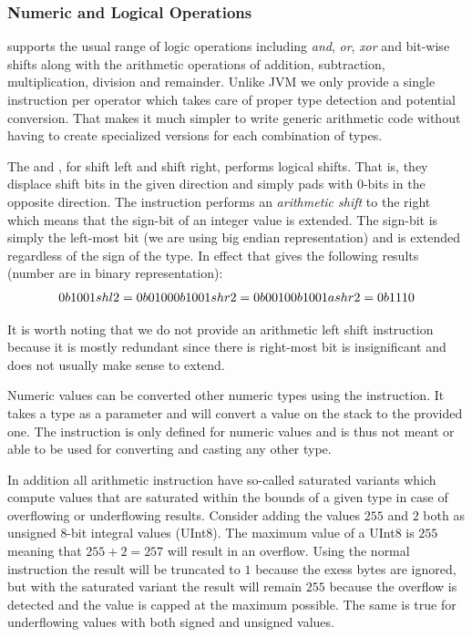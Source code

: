
\subsubsection{Numeric and Logical Operations}

\thename{} supports the usual range of logic operations including \emph{and},
\emph{or}, \emph{xor} and bit-wise shifts along with the arithmetic operations
of addition, subtraction, multiplication, division and remainder. Unlike JVM we
only provide a single instruction per operator which takes care of proper type
detection and potential conversion. That makes it much simpler to write generic
arithmetic code without having to create specialized versions for each
combination of types.

The  and , for shift left and shift right, performs logical
shifts. That is, they displace shift bits in the given direction and simply pads
with 0-bits in the opposite direction. The  instruction performs an
\textit{arithmetic shift} to the right which means that the sign-bit of an
integer value is extended. The sign-bit is simply the left-most bit (we are
using big endian representation) and is extended regardless of the sign of the
type. In effect that gives the following results (number are in binary
representation):
\[
0b1001 shl 2  = 0b0100 \\
0b1001 shr 2  = 0b0010 \\
0b1001 ashr 2 = 0b1110 \\
\]

It is worth noting that we do not provide an arithmetic left shift instruction
because it is mostly redundant since there is right-most bit is insignificant
and does not usually make sense to extend.

Numeric values can be converted other numeric types using the 
instruction. It takes a type as a parameter and will convert a value on the
stack to the provided one. The  instruction is only defined for
numeric values and is thus not meant or able to be used for converting and
casting any other type.

In addition all arithmetic instruction have so-called saturated variants which
compute values that are saturated within the bounds of a given type in case of
overflowing or underflowing results. Consider adding the values $255$ and $2$
both as unsigned 8-bit integral values (UInt8). The maximum value of a UInt8 is
$255$ meaning that $255+2=257$ will result in an overflow. Using the normal
 instruction the result will be truncated to $1$ because the exess
bytes are ignored, but with the saturated variant the result will remain $255$
because the overflow is detected and the value is capped at the maximum
possible. The same is true for underflowing values with both signed and unsigned
values.

